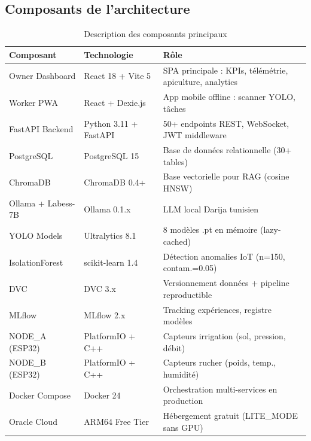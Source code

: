 \subsection{Composants de l'architecture}

\begin{table}[H]\centering
\caption{Description des composants principaux}
\label{tab:composants}
\begin{tabular}{lp{4cm}p{6cm}}
\toprule
\textbf{Composant} & \textbf{Technologie} & \textbf{Rôle} \\
\midrule
Owner Dashboard   & React 18 + Vite 5       & SPA principale : KPIs, télémétrie, apiculture, analytics \\
Worker PWA        & React + Dexie.js        & App mobile offline : scanner YOLO, tâches \\
FastAPI Backend   & Python 3.11 + FastAPI   & 50+ endpoints REST, WebSocket, JWT middleware \\
PostgreSQL        & PostgreSQL 15           & Base de données relationnelle (30+ tables) \\
ChromaDB          & ChromaDB 0.4+           & Base vectorielle pour RAG (cosine HNSW) \\
Ollama + Labess-7B & Ollama 0.1.x            & LLM local Darija tunisien \\
YOLO Models       & Ultralytics 8.1         & 8 modèles .pt en mémoire (lazy-cached) \\
IsolationForest   & scikit-learn 1.4        & Détection anomalies IoT (n=150, contam.=0.05) \\
DVC               & DVC 3.x                 & Versionnement données + pipeline reproductible \\
MLflow            & MLflow 2.x              & Tracking expériences, registre modèles \\
NODE\_A (ESP32)   & PlatformIO + C++        & Capteurs irrigation (sol, pression, débit) \\
NODE\_B (ESP32)   & PlatformIO + C++        & Capteurs rucher (poids, temp., humidité) \\
Docker Compose    & Docker 24               & Orchestration multi-services en production \\
Oracle Cloud      & ARM64 Free Tier         & Hébergement gratuit (LITE\_MODE sans GPU) \\
\bottomrule
\end{tabular}
\end{table}

